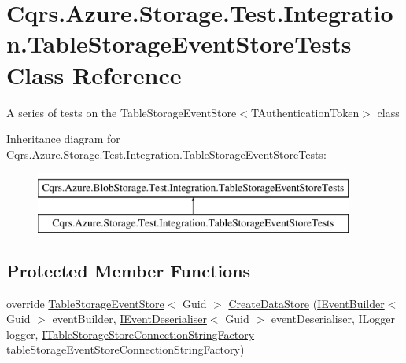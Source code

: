 \hypertarget{classCqrs_1_1Azure_1_1Storage_1_1Test_1_1Integration_1_1TableStorageEventStoreTests}{}\section{Cqrs.\+Azure.\+Storage.\+Test.\+Integration.\+Table\+Storage\+Event\+Store\+Tests Class Reference}
\label{classCqrs_1_1Azure_1_1Storage_1_1Test_1_1Integration_1_1TableStorageEventStoreTests}


A series of tests on the Table\+Storage\+Event\+Store$<$\+T\+Authentication\+Token$>$ class  


Inheritance diagram for Cqrs.\+Azure.\+Storage.\+Test.\+Integration.\+Table\+Storage\+Event\+Store\+Tests\+:\begin{figure}[H]
\begin{center}
\leavevmode
\includegraphics[height=2.000000cm]{classCqrs_1_1Azure_1_1Storage_1_1Test_1_1Integration_1_1TableStorageEventStoreTests}
\end{center}
\end{figure}
\subsection*{Protected Member Functions}
\begin{DoxyCompactItemize}
\item 
override \hyperlink{classCqrs_1_1Azure_1_1BlobStorage_1_1Events_1_1TableStorageEventStore}{Table\+Storage\+Event\+Store}$<$ Guid $>$ \hyperlink{classCqrs_1_1Azure_1_1Storage_1_1Test_1_1Integration_1_1TableStorageEventStoreTests_a4e143d134a156e2ab0d044d7f6f15b5d_a4e143d134a156e2ab0d044d7f6f15b5d}{Create\+Data\+Store} (\hyperlink{interfaceCqrs_1_1Events_1_1IEventBuilder}{I\+Event\+Builder}$<$ Guid $>$ event\+Builder, \hyperlink{interfaceCqrs_1_1Events_1_1IEventDeserialiser}{I\+Event\+Deserialiser}$<$ Guid $>$ event\+Deserialiser, I\+Logger logger, \hyperlink{interfaceCqrs_1_1Azure_1_1BlobStorage_1_1ITableStorageStoreConnectionStringFactory}{I\+Table\+Storage\+Store\+Connection\+String\+Factory} table\+Storage\+Event\+Store\+Connection\+String\+Factory)
\end{DoxyCompactItemize}
